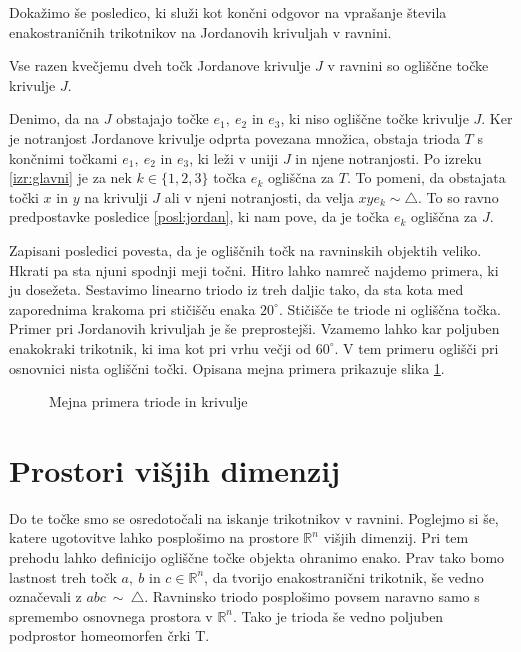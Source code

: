 \documentclass[mat1]{fmfdelo}
\newcommand{\R}{\mathbb R}
\begin{document}
Dokažimo še posledico, ki služi kot končni odgovor na vprašanje števila enakostraničnih trikotnikov na Jordanovih krivuljah v ravnini.
\begin{posledica}
Vse razen kvečjemu dveh točk Jordanove krivulje $J$ v ravnini so ogliščne točke krivulje $J$.
\end{posledica}
\proof
Denimo, da na $J$ obstajajo točke $e_1,\ e_2$ in $e_3$, ki niso ogliščne točke krivulje $J$. Ker je notranjost Jordanove krivulje odprta povezana množica, obstaja trioda $T$ s končnimi točkami $e_1,\ e_2$ in $e_3$, ki leži v uniji $J$ in njene notranjosti. Po izreku \ref{izr:glavni} je za nek $k \in \{1, 2, 3\}$ točka $e_k$ ogliščna za $T$. To pomeni, da obstajata točki $x$ in $y$ na krivulji $J$ ali v njeni notranjosti, da velja $xye_k \sim \triangle$. To so ravno predpostavke posledice \ref{posl:jordan}, ki nam pove, da je točka $e_k$ ogliščna za $J$.
\endproof

Zapisani posledici povesta, da je ogliščnih točk na ravninskih objektih veliko. Hkrati pa sta njuni spodnji meji točni. Hitro lahko namreč najdemo primera, ki ju dosežeta. Sestavimo linearno triodo iz treh daljic tako, da sta kota med zaporednima krakoma pri stičišču enaka $20^\circ$. Stičišče te triode ni ogliščna točka. Primer pri Jordanovih krivuljah je še preprostejši. Vzamemo lahko kar poljuben enakokraki trikotnik, ki ima kot pri vrhu večji od $60^\circ$. V tem primeru oglišči pri osnovnici nista ogliščni točki. Opisana mejna primera prikazuje slika \ref{fig:mejna_primera}.

\begin{figure}[h!]
\centering
{}
\caption{Mejna primera triode in krivulje}
\label{fig:mejna_primera}
\end{figure}

\section{Prostori višjih dimenzij}
Do te točke smo se osredotočali na iskanje trikotnikov v ravnini. Poglejmo si še, katere ugotovitve lahko posplošimo na prostore $\R^n$ višjih dimenzij. Pri tem prehodu lahko definicijo ogliščne točke objekta ohranimo enako. Prav tako bomo lastnost treh točk $a,\ b$ in $c \in \R^n$, da tvorijo enakostranični trikotnik, še vedno označevali z $abc~\sim~\triangle$. Ravninsko triodo posplošimo povsem naravno samo s spremembo osnovnega prostora v $\R^n$. Tako je trioda še vedno poljuben podprostor homeomorfen črki T. 
\end{document}

